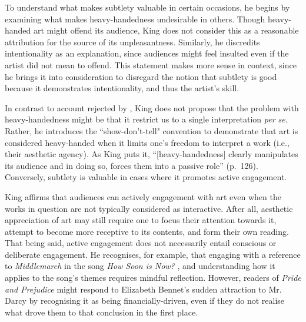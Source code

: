 
To understand what makes subtlety valuable in certain occasions, he begins by examining what makes heavy-handedness undesirable in others. Though heavy-handed art might offend its audience, King does not consider this as a reasonable attribution for the source of its unpleasantness. Similarly, he discredits intentionality as an explanation, since audiences might feel insulted even if the artist did not mean to offend. This statement makes more sense in context, since he brings it into consideration to disregard the notion that subtlety is good because it demonstrates intentionality, and thus the artist's skill. 


In contrast to account rejected by \textcite{repp_whats_2012}, King does not propose that the problem with heavy-handedness might be that it restrict us to a single interpretation \textit{per se}. Rather, he introduces the ``show-don't-tell" convention to demonstrate that art is considered heavy-handed when it limits one's freedom to interpret a work (i.e., their aesthetic agency). As King puts it, ``[heavy-handedness] clearly manipulates its audience and in doing so, forces them into a passive role'' (p.~126). Conversely, subtlety is valuable in cases where it  promotes active engagement.


King affirms that audiences can actively engagement with art even when the works in question are not typically considered as interactive. After all, aesthetic appreciation of art may still require one to focus their attention towards it, attempt to become more receptive to its contents, and form their own reading. That being said, active engagement does not necessarily entail conscious or deliberate engagement. He recognises, for example, that engaging with a reference to \textit{Middlemarch} \parencite{eliot_middlemarch_2008} in the song \textit{How Soon is Now?} \parencite{the_smiths_how_1985}, and understanding how it applies to the song's themes requires mindful reflection. However, readers of \textit{Pride and Prejudice} \parencite{austen_pride_2002} might respond to Elizabeth Bennet's sudden attraction to Mr. Darcy by recognising it as being financially-driven, even if they do not realise what drove them to that conclusion in the first place.

